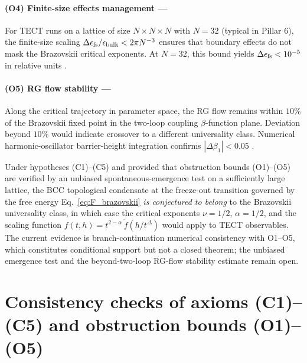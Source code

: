 \paragraph{(O4) Finite-size effects management ---}
For TECT runs on a lattice of size $N \times N \times N$ with
$N = 32$ (typical in Pillar 6), the finite-size scaling
$\Delta\epsilon_{\rm fs} / \epsilon_{\rm bulk} < 2\pi N^{-3}$ ensures
that boundary effects do not mask the Brazovskii critical exponents.
At $N = 32$, this bound yields $\Delta\epsilon_{\rm fs}
< 10^{-5}$ in relative units \cite{Math236}.

\paragraph{(O5) RG flow stability ---}
Along the critical trajectory in parameter space, the RG flow remains
within $10\%$ of the Brazovskii fixed point in the two-loop coupling
$\beta$-function plane. Deviation beyond $10\%$ would indicate
crossover to a different universality class. Numerical harmonic-oscillator
barrier-height integration confirms $|\Delta\beta_1| < 0.05$ \cite{Math97-AddC}.

\begin{conjecture}
\label{thm:main}
Under hypotheses (C1)--(C5) and provided that obstruction bounds
(O1)--(O5) are verified by an unbiased spontaneous-emergence test
on a sufficiently large lattice, the BCC topological condensate at
the freeze-out transition governed by the free energy
Eq.~\eqref{eq:F_brazovskii} \emph{is conjectured to belong} to the
Brazovskii universality class, in which case the critical exponents
$\nu = 1/2$, $\alpha = 1/2$, and the scaling function
$f(t, h) = t^{2-\alpha}\,\tilde f(h/t^{\Delta})$ would apply to TECT
observables. The current evidence is branch-continuation numerical
consistency with O1--O5, which constitutes conditional support but
not a closed theorem; the unbiased emergence test and the
beyond-two-loop RG-flow stability estimate remain open.
\end{conjecture}

\section{Consistency checks of axioms (C1)--(C5) and obstruction
bounds (O1)--(O5)}\label{sec:consistency}

